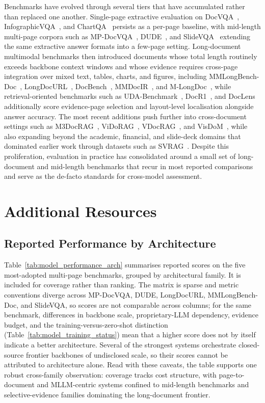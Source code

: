 \documentclass[11pt]{article}
\begin{document}
Benchmarks have evolved through several tiers that have accumulated rather than replaced one another. Single-page extractive evaluation on DocVQA~\cite{mathew2021docvqa}, InfographicVQA~\cite{mathew2022infographicvqa}, and ChartQA~\cite{masry2022chartqa} persists as a per-page baseline, with mid-length multi-page corpora such as MP-DocVQA~\cite{tito2023hierarchical}, DUDE~\cite{van2023dude}, and SlideVQA~\cite{tanaka2023slidevqa} extending the same extractive answer formats into a few-page setting. Long-document multimodal benchmarks then introduced documents whose total length routinely exceeds backbone context windows and whose evidence requires cross-page integration over mixed text, tables, charts, and figures, including MMLongBench-Doc~\cite{ma2024mmlongbench}, LongDocURL~\cite{deng2025longdocurl}, DocBench~\cite{zou2024docbench}, MMDocIR~\cite{dong2025mmdocir}, and M-LongDoc~\cite{chia2025m}, while retrieval-oriented benchmarks such as UDA-Benchmark~\cite{hui2024uda}, DocR1~\cite{xiong2026docr1}, and DocLens~\cite{zhu2026doclens} additionally score evidence-page selection and layout-level localisation alongside answer accuracy. The most recent additions push further into cross-document settings such as M3DocRAG~\cite{cho2024m3docrag}, ViDoRAG~\cite{wang2025vidorag}, VDocRAG~\cite{tanaka2025vdocrag}, and VisDoM~\cite{suri2025visdom}, while also expanding beyond the academic, financial, and slide-deck domains that dominated earlier work through datasets such as SVRAG~\cite{chen2025svrag}. Despite this proliferation, evaluation in practice has consolidated around a small set of long-document and mid-length benchmarks that recur in most reported comparisons and serve as the de-facto standards for cross-model assessment. 

\section{Additional Resources}


\subsection{Reported Performance by Architecture}
\label{app:performance}
Table~\ref{tab:model_performance_arch} summarises reported scores on the five most-adopted multi-page benchmarks, grouped by architectural family. It is included for coverage rather than ranking. The matrix is sparse and metric conventions diverge across MP-DocVQA, DUDE, LongDocURL, MMLongBench-Doc, and SlideVQA, so scores are not comparable across columns; for the same benchmark, differences in backbone scale, proprietary-LLM dependency, evidence budget, and the training-versus-zero-shot distinction (Table~\ref{tab:model_training_status}) mean that a higher score does not by itself indicate a better architecture. Several of the strongest systems orchestrate closed-source frontier backbones of undisclosed scale, so their scores cannot be attributed to architecture alone. Read with these caveats, the table supports one robust cross-family observation: coverage tracks cost structure, with page-to-document and MLLM-centric systems confined to mid-length benchmarks and selective-evidence families dominating the long-document frontier.
\end{document}
